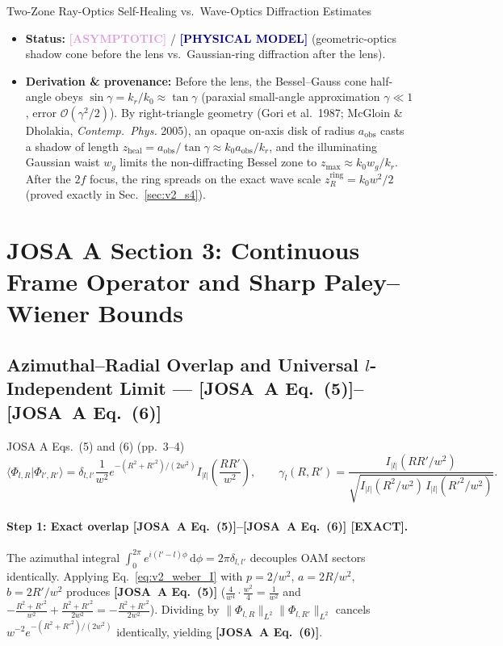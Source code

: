 \documentclass[10pt,letterpaper]{article}
\newcommand{\braket}[2]{\langle #1 | #2 \rangle}
\newcommand{\norm}[1]{\lVert #1 \rVert}
\newcommand{\abs}[1]{\lvert #1 \rvert}
\newcommand{\dd}{\mathrm{d}}
\newcommand{\josa}[1]{\textbf{[JOSA~A Eq.~(#1)]}}
\newcommand{\tagexact}{\textcolor{forest}{\textbf{[EXACT]}}}
\newcommand{\tagmodel}{\textcolor{navy}{\textbf{[PHYSICAL MODEL]}}}
\newcommand{\tagasymp}{\textcolor{plum}{\textbf{[ASYMPTOTIC]}}}
\numberwithin{equation}{section}
\begin{document}
\begin{approxbox}{Two-Zone Ray-Optics Self-Healing vs.\ Wave-Optics Diffraction Estimates}
\begin{itemize}[leftmargin=1.4em,itemsep=2pt,topsep=1pt]
  \item \textbf{Status:} \tagasymp{} / \tagmodel{} (geometric-optics shadow cone before the lens vs.\ Gaussian-ring diffraction after the lens).
  \item \textbf{Derivation \& provenance:} Before the lens, the Bessel--Gauss cone half-angle obeys $\sin\gamma = k_r/k_0 \approx \tan\gamma$ (paraxial small-angle approximation $\gamma \ll 1$, error $\mathcal{O}(\gamma^2/2)$). By right-triangle geometry (Gori et al.~1987; McGloin \& Dholakia, \emph{Contemp.\ Phys.} 2005), an opaque on-axis disk of radius $a_{\mathrm{obs}}$ casts a shadow of length $z_{\mathrm{heal}} = a_{\mathrm{obs}}/\tan\gamma \approx k_0 a_{\mathrm{obs}}/k_r$, and the illuminating Gaussian waist $w_g$ limits the non-diffracting Bessel zone to $z_{\max} \approx k_0 w_g/k_r$. After the $2f$ focus, the ring spreads on the exact wave scale $z_R^{\mathrm{ring}} = k_0 w^2/2$ (proved exactly in Sec.~\ref{sec:v2_s4}).
\end{itemize}
\end{approxbox}

\section{JOSA A Section 3: Continuous Frame Operator and Sharp Paley--Wiener Bounds}
\label{sec:v2_s3}

\subsection{Azimuthal--Radial Overlap and Universal $l$-Independent Limit --- \josa{5}--\josa{6}}

\begin{targeteq}{JOSA A Eqs.~(5) and (6) (pp.~3--4)}
\[
  \braket{\Phi_{l,R}}{\Phi_{l',R'}} = \delta_{l,l'}\frac{1}{w^2}e^{-(R^2+R'^2)/(2w^2)} I_{\abs{l}}\!\left(\frac{RR'}{w^2}\right), \qquad
  \gamma_l(R,R') = \frac{I_{\abs{l}}(RR'/w^2)}{\sqrt{I_{\abs{l}}(R^2/w^2)\,I_{\abs{l}}(R'^2/w^2)}}.
\]
\end{targeteq}

\paragraph*{Step 1: Exact overlap \josa{5}--\josa{6} \tagexact{}.}
The azimuthal integral $\int_0^{2\pi} e^{i(l'-l)\phi}\,\dd\phi = 2\pi\delta_{l,l'}$ decouples OAM sectors identically. Applying Eq.~\eqref{eq:v2_weber_I} with $p = 2/w^2$, $a = 2R/w^2$, $b = 2R'/w^2$ produces \josa{5} ($\frac{4}{w^4}\cdot\frac{w^2}{4} = \frac{1}{w^2}$ and $-\frac{R^2+R'^2}{w^2} + \frac{R^2+R'^2}{2w^2} = -\frac{R^2+R'^2}{2w^2}$). Dividing by $\norm{\Phi_{l,R}}_{L^2}\norm{\Phi_{l,R'}}_{L^2}$ cancels $w^{-2} e^{-(R^2+R'^2)/(2w^2)}$ identically, yielding \josa{6}.
\end{document}
